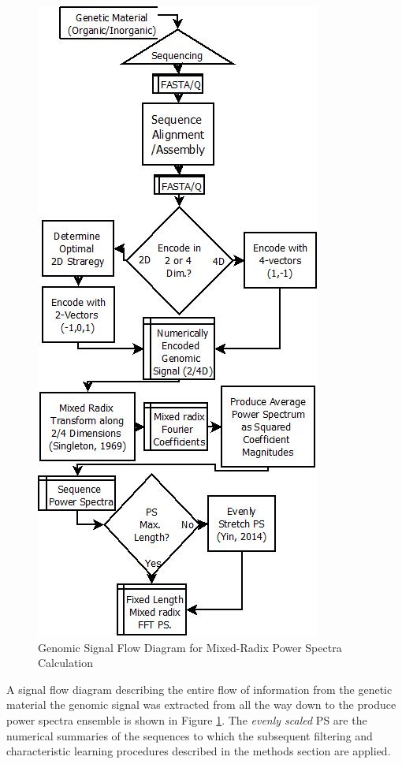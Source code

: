 \documentclass[12pt,conference]{IEEEtran}
\begin{document}
\vspace{-1 em}
\begin{figure}[h!]
\caption{Genomic Signal Flow Diagram for Mixed-Radix Power Spectra Calculation} 
\label{fig:fftflow} 
\begin{center} 
\includegraphics[scale=0.45]{Images/Files/GenomicFFTSignalFlow.png}
\end{center} 
\end{figure} 


A signal flow diagram describing the entire flow of information from the genetic material the genomic 
signal was extracted from all the way down to the produce power spectra ensemble is shown in Figure 
\ref{fig:fftflow}.  The \textit{evenly scaled} PS are the numerical summaries of the sequences to which 
the subsequent filtering and characteristic learning procedures described in the methods section are applied.
\end{document}
